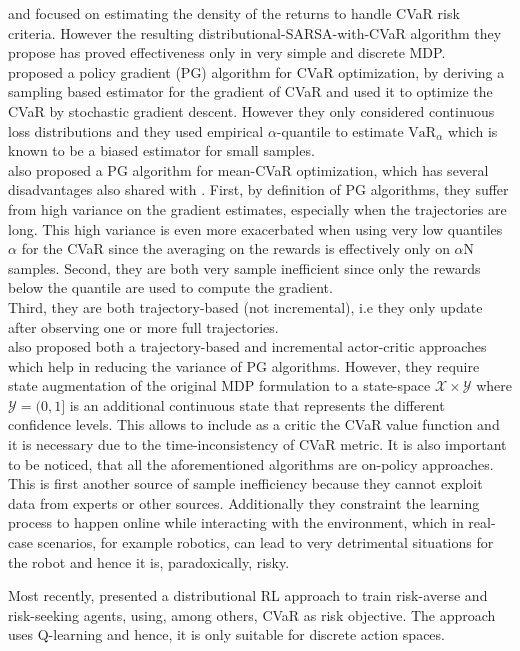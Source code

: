 \citet{Morimura2010a} and \citet{Morimura2010b}
focused on estimating the density of the returns
to handle CVaR risk criteria. However the resulting distributional-SARSA-with-CVaR algorithm they propose
has  proved  effectiveness  only  in  very  simple  and discrete MDP.\\
\citet{Tamar2015a} proposed a policy gradient (PG) algorithm for CVaR optimization, by deriving a 
sampling based estimator for the gradient of CVaR and used it to optimize the CVaR by stochastic gradient descent.
However they only considered continuous loss distributions and they used empirical $\alpha$-quantile to estimate 
$\text{VaR}_\alpha$ which is known to be a biased estimator for small samples.\\
\citet{Chow2014} also proposed a PG algorithm for mean-CVaR optimization, which has several disadvantages
also shared with \citet{Tamar2015}. First, by definition of PG algorithms, they suffer from
high variance on the gradient estimates, especially when the trajectories are long. This high variance
is even more exacerbated when using very low quantiles $\alpha$ for the CVaR 
since the averaging on the rewards is effectively only on $\alpha$N samples.
Second, they are both very sample inefficient since only the rewards below the quantile
are used to compute the gradient.\\
Third, they are both trajectory-based (not incremental), 
i.e they only update after observing one or more full trajectories.\\
\citet{Chow2014} also proposed both a trajectory-based and incremental actor-critic approaches which help
in reducing the variance of PG algorithms. However, they require state augmentation of the original MDP formulation to a
state-space $\mathcal{X} \times \mathcal{Y}$ where 
$\mathcal{Y} = (0,1]$ is an additional continuous state that represents the different confidence levels. 
This allows to include as a critic the CVaR value function and it is necessary due to 
the time-inconsistency of CVaR metric.
It is also important to be noticed, that all the aforementioned algorithms are on-policy approaches.
This is first another source of sample inefficiency
because they cannot exploit data from experts or other sources. Additionally they constraint the 
learning process to happen online while interacting with the environment, which in real-case scenarios,
for example robotics, can lead to very detrimental situations for the robot and hence it is,
paradoxically, risky.

Most recently, \citet{Dabney2018b} presented a distributional RL approach to train risk-averse and risk-seeking agents,
using, among others, CVaR as risk objective. The approach uses Q-learning
and hence, it is only suitable for discrete action spaces.

